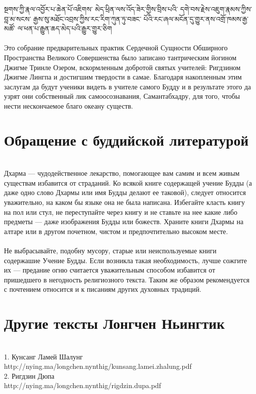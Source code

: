 སྔགས་ཀྱི་རྣལ་འབྱོར་པ་ཆེན་པོ་འཇིགས་
མེད་ཕྲིན་ལས་འོད་ཟེར་གྱིས་བྲིས་པའི་
དགེ་བས་རྗེས་འཇུག་རྣམས་ཀྱིས་བླ་མ་སངས་
རྒྱས་སུ་མཐོང་འབྲས་ཀྱིས་རང་རིག་ཀུན་ཏུ་བཟང་
པོའི་རང་ཞལ་མངོན་དུ་གྱུར་ནས་འགྲོ་ཁམས་རྒྱ་མཚོ་
ལ་ཕན་པ་རྒྱུན་ཆད་མེད་པའི་རྒྱུར་གྱུར་ཅིག\\
\\
\ru\scriptsize\noindent
Это собрание предварительных практик Сердечной Сущности
Об\-ширного Пространства Великого Совершенства было записано
тантри\-ческим йогином Джигме Тринле Озером,
вскормленным добротой святых учителей: Ригдзином Джигме Лингпа
и достигшим твердости в самае. Благодаря накопленным
этим заслугам да будут ученики видеть в учителе самого Будду
и в результате этого да узрят они собственный лик
самоосознавания, Самантабхадру, для того, чтобы нести
нескончаемое благо океану существ.
\normalsize
\newpage
\section*{Обращение с буддийской литературой}
\\
Дхарма — чудодейственное лекарство, помогающее вам
самим и всем живым существам избавится от страданий.
Ко всякой книге содержащей учение Будды (а даже одно
слово Дхармы или имя Будды делают ее таковой),  следует
относится уважи\-тельно, на каком бы языке она не была написана.
Избегайте класть книгу на пол или стул, не переступайте
через книгу и не ставьте на нее какие либо
предметы — даже изображения Будды или божеств.
Храните книги Дхармы на алтаре или в другом почетном,
чистом и предпочтительно высоком месте.
\paragraph{}
Не выбрасывайте, подобну мусору, старые или неиспользуе\-мые
книги содержашие Учение Будды. Если возникла такая необходимость,
лучше сожгите их — предание огню считается уважительным
способом избавится от пришедшего в негод\-ность 
религиозного текста. Таким же образом рекомендуется
с почтением относится и к писаниям других духовных традиций.
\newpage
\section*{Другие тексты Лонгчен Ньингтик}
\\
1. Кунсанг Ламей Шалунг\\
http://nying.ma/longchen.nynthig/kunsang.lamei.zhalung.pdf\\

2. Ригдзин Дюпа\\
http://nying.ma/longchen.nynthig/rigdzin.dupa.pdf\\

